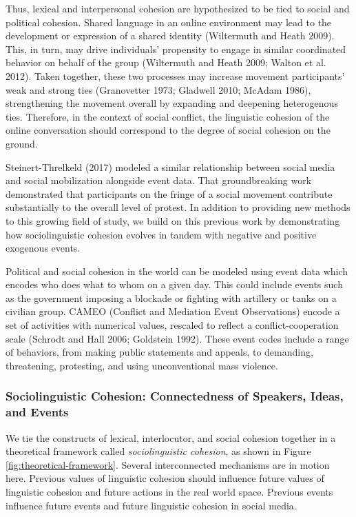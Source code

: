 \documentclass[
  english,
  man]{apa6}
\begin{document}
Thus, lexical and interpersonal cohesion are hypothesized to be tied to social
and political cohesion. Shared language in an online environment may lead to the
development or expression of a shared identity (Wiltermuth and Heath 2009). This,
in turn, may drive individuals' propensity to engage in similar coordinated
behavior on behalf of the group (Wiltermuth and Heath 2009; Walton et al. 2012).
Taken together, these two processes may increase movement participants' weak and
strong ties (Granovetter 1973; Gladwell 2010; McAdam 1986), strengthening the movement overall by expanding and
deepening heterogenous ties. Therefore, in the context of social conflict, the
linguistic cohesion of the online conversation should correspond to the degree
of social cohesion on the ground.

Steinert-Threlkeld (2017) modeled a similar relationship
between social media and social mobilization alongside event data. That
groundbreaking work demonstrated that participants on the fringe of a social
movement contribute substantially to the overall level of protest. In addition
to providing new methods to this growing field of study, we build on this
previous work by demonstrating how sociolinguistic cohesion evolves in
tandem with negative and positive exogenous events.

Political and social cohesion in the world can be modeled using event data which
encodes who does what to whom on a given day. This could include events such as
the government imposing a blockade or fighting with artillery or tanks on
a civilian group. CAMEO (Conflict and Mediation Event Observations) encode
a set of activities with numerical values, rescaled to reflect a
conflict-cooperation scale (Schrodt and Hall 2006; Goldstein 1992). These event
codes include a range of behaviors, from making public statements and appeals,
to demanding, threatening, protesting, and using unconventional mass violence.

\hypertarget{sociolinguistic-cohesion-connectedness-of-speakers-ideas-and-events}{%
\subsubsection{Sociolinguistic Cohesion: Connectedness of Speakers, Ideas, and Events}\label{sociolinguistic-cohesion-connectedness-of-speakers-ideas-and-events}}

We tie the constructs of lexical, interlocutor, and social cohesion together in
a theoretical framework called \emph{sociolinguistic cohesion}, as shown in Figure
\ref{fig:theoretical-framework}. Several interconnected mechanisms are in
motion here. Previous values of linguistic cohesion should influence future
values of linguistic cohesion and future actions in the real world space.
Previous events influence future events and future linguistic cohesion in
social media.
\end{document}
